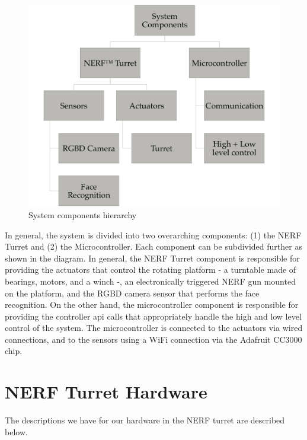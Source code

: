 \documentclass[journal]{IEEEtran}
\begin{document}
\begin{figure}[htbp]
    \centering
    \includegraphics[width=0.80\linewidth]{components.png}
    \caption{System components hierarchy}
    \label{fig:components}
\end{figure}

In general, the system is divided into two overarching components: (1) the NERF Turret and (2) the Microcontroller. Each component can be subdivided further as shown in the diagram. In general, the NERF Turret component is responsible for providing the actuators that control the rotating platform - a turntable made of bearings, motors, and a winch -, an electronically triggered NERF gun mounted on the platform, and the RGBD camera sensor that performs the face recognition. On the other hand, the microcontroller component is responsible for providing the controller api calls that appropriately handle the high and low level control of the system. The microcontroller is connected to the actuators via wired connections, and to the sensors using a WiFi connection via the Adafruit CC3000 chip.

\section{NERF Turret Hardware}

The descriptions we have for our hardware in the NERF turret are described below.
\end{document}
